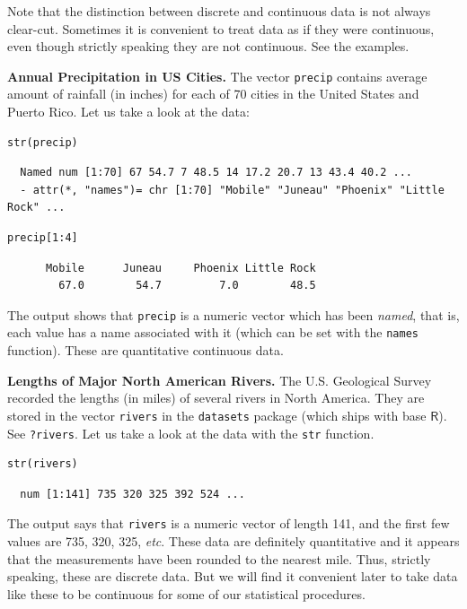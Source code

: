 \documentclass[captions=tableheading]{scrbook}
\begin{document}
Note that the distinction between discrete and continuous data is not always clear-cut. Sometimes it is convenient to treat data as if they were continuous, even though strictly speaking they are not continuous. See the examples.

\begin{example}
\textbf{Annual Precipitation in US Cities.} The vector \texttt{precip} contains average amount of rainfall (in inches) for each of 70 cities in the United States and Puerto Rico. Let us take a look at the data:


\begin{verbatim}
str(precip)
\end{verbatim}

\begin{verbatim}
  Named num [1:70] 67 54.7 7 48.5 14 17.2 20.7 13 43.4 40.2 ...
  - attr(*, "names")= chr [1:70] "Mobile" "Juneau" "Phoenix" "Little Rock" ...
\end{verbatim}


\begin{verbatim}
precip[1:4]
\end{verbatim}

\begin{verbatim}
      Mobile      Juneau     Phoenix Little Rock 
        67.0        54.7         7.0        48.5
\end{verbatim}

The output shows that \texttt{precip} is a numeric vector which has been \emph{named}, that is, each value has a name associated with it (which can be set with the \texttt{names} function). These are quantitative continuous data.

\end{example}

\begin{example}
\textbf{Lengths of Major North American Rivers.} The U.S. Geological Survey recorded the lengths (in miles) of several rivers in North America. They are stored in the vector \texttt{rivers} in the \texttt{datasets} package (which ships with base \(\mathsf{R}\)). See \texttt{?rivers}. Let us take a look at the data with the \texttt{str} function.


\begin{verbatim}
str(rivers)
\end{verbatim}

\begin{verbatim}
  num [1:141] 735 320 325 392 524 ...
\end{verbatim}

The output says that \texttt{rivers} is a numeric vector of length 141, and the first few values are 735, 320, 325, \emph{etc}. These data are definitely quantitative and it appears that the measurements have been rounded to the nearest mile. Thus, strictly speaking, these are discrete data. But we will find it convenient later to take data like these to be continuous for some of our statistical procedures. 
\end{example}
\end{document}
